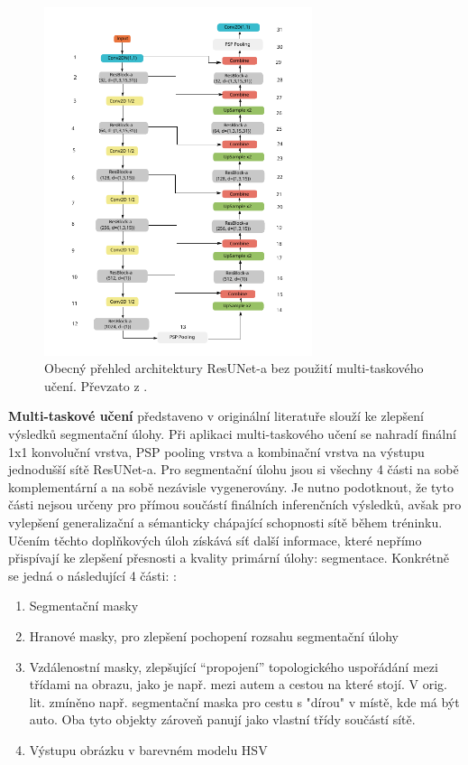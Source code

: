 \begin{figure}[H]
\centering
\includegraphics[width=0.7\textwidth,keepaspectratio]{Figures/resuneta_overview.pdf}
\caption[Obecný přehled architektury ResUNet-a]{Obecný přehled architektury ResUNet-a bez použití multi-taskového učení. Převzato z \cite{resuneta}. }
\label{fig:resuneta_overview}
\end{figure}

\textbf{Multi-taskové učení} představeno v originální literatuře slouží ke zlepšení výsledků segmentační úlohy. Při aplikaci multi-taskového učení se nahradí finální 1x1 konvoluční vrstva, PSP pooling vrstva a kombinační vrstva na výstupu jednodušší sítě ResUNet-a. Pro segmentační úlohu jsou si všechny 4 části na sobě komplementární a na sobě nezávisle vygenerovány. Je nutno podotknout, že tyto části nejsou určeny pro přímou součástí finálních inferenčních výsledků, avšak pro vylepšení generalizační a sémanticky chápající schopnosti sítě během tréninku. Učením těchto doplňkových úloh získává síť další informace, které nepřímo přispívají ke zlepšení přesnosti a kvality primární úlohy: segmentace. Konkrétně se jedná o následující 4 části: \cite{resuneta}: 
\begin{enumerate}
    \item Segmentační masky
    \item Hranové masky, pro zlepšení pochopení rozsahu segmentační úlohy
    \item Vzdálenostní masky, zlepšující \enquote{propojení} topologického uspořádání mezi třídami na obrazu, jako je např. mezi autem a cestou na které stojí. V orig. lit. zmíněno např. segmentační maska pro cestu s "dírou" v místě, kde má být auto. Oba tyto objekty zároveň panují jako vlastní třídy součástí sítě.
    \item Výstupu obrázku v barevném modelu HSV
\end{enumerate}
\endinput